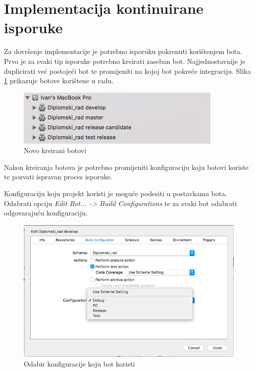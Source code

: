 \documentclass[times, utf8, diplomski, numeric]{fer}
\begin{document}
\section{Implementacija kontinuirane isporuke}

Za dovršenje implementacije je potrebno isporuku pokrenuti korištenjem bota. Prvo je za svaki tip isporuke potrebno kreirati zaseban bot. Najjednostavnije je duplicirati već postojeći bot te promijeniti na kojoj bot pokreće integraciju. Slika \ref{fig:MultipleBots} prikazuje botove korištene u radu.

\begin{figure}[b!]
\centering
\includegraphics[scale=0.7]{MultipleBots}
\caption{Novo kreirani botovi}
\label{fig:MultipleBots}
\end{figure}

Nakon kreiranja botova je potrebno promijeniti konfiguraciju koju botovi koriste te pozvati ispravan proces isporuke.

Konfiguraciju koju projekt koristi je moguće podesiti u postavkama bota. Odabrati opciju \textit{Edit Bot... -> Build Configurations} te za svaki bot odabrati odgovarajuću konfiguraciju.

\begin{figure}
\centering
\includegraphics[scale=0.5]{BotConfiguration}
\caption{Odabir konfiguracije koju bot koristi}
\label{fig:BotConfiguration}
\end{figure}
\end{document}
